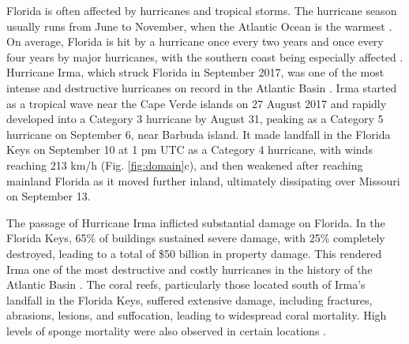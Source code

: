 \documentclass[fleqn,10pt]{wlscirep}
\begin{document}
Florida is often affected by hurricanes and tropical storms. The hurricane season usually runs from June to November, when the Atlantic Ocean is the warmest \citep{Neumann1999}. On average, Florida is hit by a hurricane once every two years and once every four years by major hurricanes, with the southern coast being especially affected \citep{Malmstadt2009Jan,IFAS2021Aug}. Hurricane Irma, which struck Florida in September 2017, was one of the most intense and destructive hurricanes on record in the Atlantic Basin \citep{Cangialosi2018,Xian2018Jul}. Irma started as a tropical wave near the Cape Verde islands on 27 August 2017 and rapidly developed into a Category 3 hurricane by August 31, peaking as a Category 5 hurricane on September 6, near Barbuda island. It made landfall in the Florida Keys on September 10 at 1 pm UTC as a Category 4 hurricane, with winds reaching 213 km/h (Fig. \ref{fig:domain}c), and then weakened after reaching mainland Florida as it moved further inland, ultimately dissipating over Missouri on September 13.

The passage of Hurricane Irma inflicted substantial damage on Florida. In the Florida Keys, 65\% of buildings sustained severe damage, with 25\% completely destroyed, leading to a total of \$50 billion in property damage. This rendered Irma one of the most destructive and costly hurricanes in the history of the Atlantic Basin \citep{Cangialosi2018,NOAAcost}. The coral reefs, particularly those located south of Irma's landfall in the Florida Keys, suffered extensive damage, including fractures, abrasions, lesions, and suffocation, leading to widespread coral mortality. High levels of sponge mortality were also observed in certain locations \citep{NOAAirma2022Aug}. %
\end{document}
